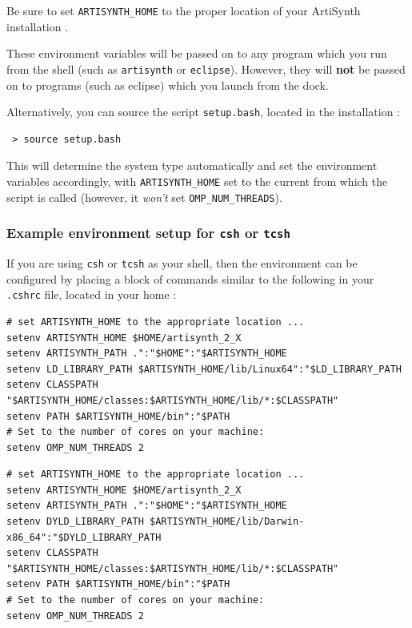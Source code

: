 Be sure to set {\tt ARTISYNTH\_HOME} to the proper location of your
ArtiSynth installation \directory.

These environment variables will be passed on to any program which you
run from the shell (such as {\tt artisynth} or {\tt eclipse}).
\ifMacOS
However, they will {\bf not} be passed on to programs (such as eclipse)
which you launch from the dock.
\fi

Alternatively, you can source the script {\tt setup.bash}, located in
the installation \directory:

\begin{verbatim}
 > source setup.bash
\end{verbatim}

This will determine the system type automatically and set the
environment variables accordingly, with {\tt ARTISYNTH\_HOME} set to the
current \directory from which the script is called (however,
it {\it won't} set {\tt OMP\_NUM\_THREADS}).

\subsubsection{Example environment setup for {\tt csh} or {\tt tcsh}}
\label{CshEnvironmentSetup}

If you are using {\tt csh} or {\tt tcsh} as your shell, then the
environment can be configured by placing a block of commands similar
to the following in your {\tt .cshrc} file, located in your home
\directory:

\ifLinux
\begin{lstlisting}
# set ARTISYNTH_HOME to the appropriate location ...
setenv ARTISYNTH_HOME $HOME/artisynth_2_X
setenv ARTISYNTH_PATH .":"$HOME":"$ARTISYNTH_HOME
setenv LD_LIBRARY_PATH $ARTISYNTH_HOME/lib/Linux64":"$LD_LIBRARY_PATH
setenv CLASSPATH "$ARTISYNTH_HOME/classes:$ARTISYNTH_HOME/lib/*:$CLASSPATH"
setenv PATH $ARTISYNTH_HOME/bin":"$PATH
# Set to the number of cores on your machine:
setenv OMP_NUM_THREADS 2 
\end{lstlisting}
\else\ifMacOS
\begin{lstlisting}
# set ARTISYNTH_HOME to the appropriate location ...
setenv ARTISYNTH_HOME $HOME/artisynth_2_X
setenv ARTISYNTH_PATH .":"$HOME":"$ARTISYNTH_HOME
setenv DYLD_LIBRARY_PATH $ARTISYNTH_HOME/lib/Darwin-x86_64":"$DYLD_LIBRARY_PATH
setenv CLASSPATH "$ARTISYNTH_HOME/classes:$ARTISYNTH_HOME/lib/*:$CLASSPATH"
setenv PATH $ARTISYNTH_HOME/bin":"$PATH
# Set to the number of cores on your machine:
setenv OMP_NUM_THREADS 2 
\end{lstlisting}
\fi\fi

